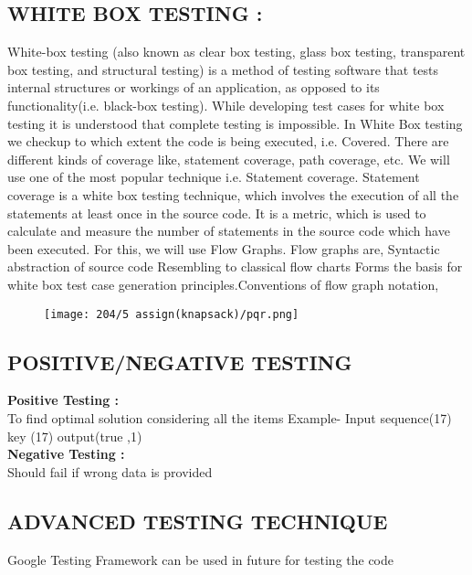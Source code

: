 \documentclass{article}
\begin{document}
	\subsection{WHITE BOX TESTING : }
	White-box testing (also known as clear box testing, glass box testing, transparent box testing, and structural testing) is a method of testing software that tests internal structures or workings of an application, as opposed to its functionality(i.e. black-box testing). While developing 
	test cases for white box testing it is understood that complete testing 
	is impossible. In White Box testing we checkup to which extent the code 
	is being executed, i.e. Covered. There are different kinds of coverage like, statement coverage, path coverage, etc. We will use one of the most popular technique i.e. Statement coverage. Statement coverage is a white box testing technique, which involves the execution of all the statements at least once in the source code. It is a metric, which is used to calculate and measure the number of statements in the source code which have been executed. For this, we will use Flow Graphs. Flow graphs are, Syntactic abstraction of source code Resembling to classical flow charts Forms the basis for white box test case generation principles.Conventions of flow graph notation, \\
	\begin{figure}[h!]
		\centering
		\texttt{[image: 204/5 assign(knapsack)/pqr.png]}
	\end{figure}
	
	\subsection{ POSITIVE/NEGATIVE TESTING }
	
	\textbf{Positive Testing :}\\
	To find optimal solution considering all the items
	Example- Input sequence(17) key (17) output(true ,1)\\
	
	\noindent\textbf{ Negative Testing :}\\
	Should fail if wrong data is provided
	
	
	\subsection{ADVANCED TESTING TECHNIQUE}
	Google Testing Framework can be used in future for testing the code
\end{document}
